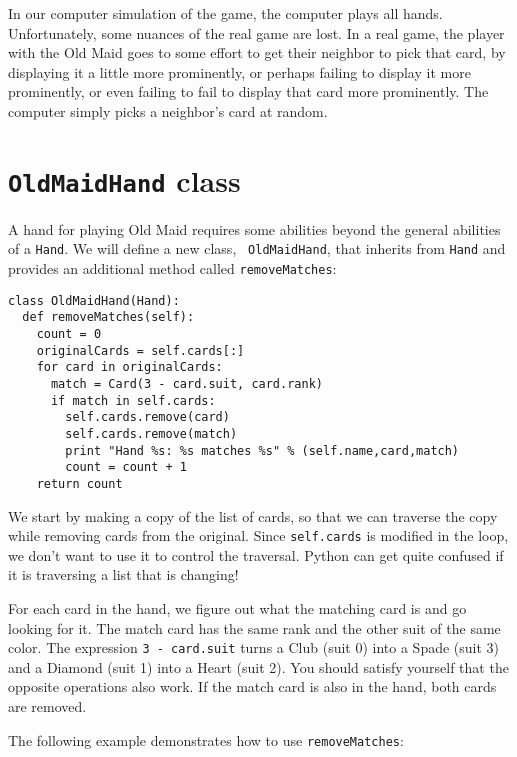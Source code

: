 In our computer simulation of the game, the computer plays
all hands.  Unfortunately, some nuances of the real game are lost.
In a real game, the player with the Old Maid
goes to some effort to get their neighbor to pick that card,
by displaying it a little more prominently, or perhaps failing
to display it more prominently, or even failing to fail to display
that card more prominently.  The computer simply picks a neighbor's
card at random.


\section {{\tt OldMaidHand} class}

A hand for playing Old Maid requires some abilities beyond the
general abilities of a {\tt Hand}.  We will define a new class, {\tt
OldMaidHand}, that inherits from {\tt Hand} and provides an additional
method called {\tt removeMatches}:


\beforeverb
\begin{verbatim}
class OldMaidHand(Hand):
  def removeMatches(self):
    count = 0
    originalCards = self.cards[:]
    for card in originalCards:
      match = Card(3 - card.suit, card.rank)
      if match in self.cards:
        self.cards.remove(card)
        self.cards.remove(match)
        print "Hand %s: %s matches %s" % (self.name,card,match)
        count = count + 1
    return count
\end{verbatim}
\afterverb
%
We start by making a copy of the list of cards, so that we can
traverse the copy while removing cards from the original.
Since {\tt self.cards} is modified in the
loop, we don't want to use it to control the traversal.  Python can get
quite confused if it is traversing a list that is changing!



For each card in the hand, we figure out what the matching card is and
go looking for it.  The match card has the same rank and the other
suit of the same color.  The expression {\tt 3 - card.suit} turns a
Club (suit 0) into a Spade (suit 3) and a Diamond (suit 1) into a
Heart (suit 2).  You should satisfy yourself that the opposite
operations also work.  If the match card is also in the hand, both
cards are removed.

The following example demonstrates how to use {\tt removeMatches}:

